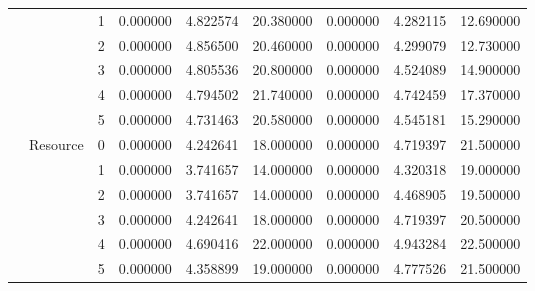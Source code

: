 \begin{tabular}{lllrrrrrr}
 &  & 1 & 0.000000 & 4.822574 & 20.380000 & 0.000000 & 4.282115 & 12.690000 \\
 &  & 2 & 0.000000 & 4.856500 & 20.460000 & 0.000000 & 4.299079 & 12.730000 \\
 &  & 3 & 0.000000 & 4.805536 & 20.800000 & 0.000000 & 4.524089 & 14.900000 \\
 &  & 4 & 0.000000 & 4.794502 & 21.740000 & 0.000000 & 4.742459 & 17.370000 \\
 &  & 5 & 0.000000 & 4.731463 & 20.580000 & 0.000000 & 4.545181 & 15.290000 \\
\cline{2-3}
 & \multirow[c]{6}{*}{Resource} & 0 & 0.000000 & 4.242641 & 18.000000 & 0.000000 & 4.719397 & 21.500000 \\
 &  & 1 & 0.000000 & 3.741657 & 14.000000 & 0.000000 & 4.320318 & 19.000000 \\
 &  & 2 & 0.000000 & 3.741657 & 14.000000 & 0.000000 & 4.468905 & 19.500000 \\
 &  & 3 & 0.000000 & 4.242641 & 18.000000 & 0.000000 & 4.719397 & 20.500000 \\
 &  & 4 & 0.000000 & 4.690416 & 22.000000 & 0.000000 & 4.943284 & 22.500000 \\
 &  & 5 & 0.000000 & 4.358899 & 19.000000 & 0.000000 & 4.777526 & 21.500000 \\
\cline{1-3} \cline{2-3}
\bottomrule
\end{tabular}
